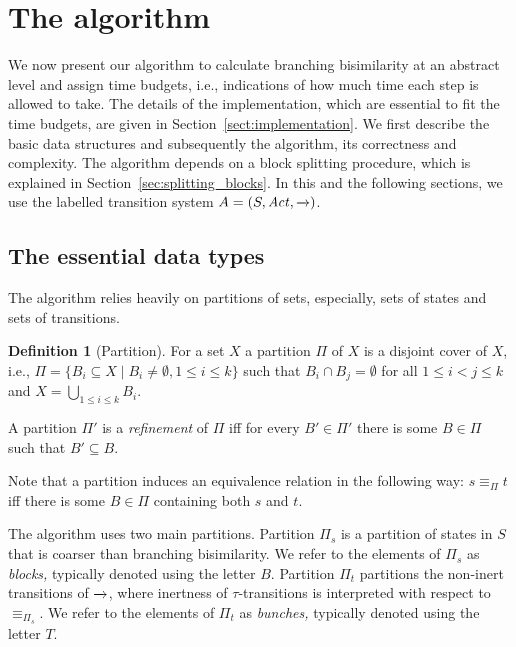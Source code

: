 \documentclass[a4paper,10pt]{article}
\theoremstyle{definition}
\newtheorem{definition}{Definition}[section]
\theoremstyle{plain}
\newcommand{\pijl}[1]{\mathrel{\text{$\xrightarrow{\smash[t]{#1}}$}}}
\begin{document}
\section{The algorithm}
\label{sec:high}

We now present our algorithm to calculate branching bisimilarity at an abstract level
and assign time budgets, i.e., indications of how much time each step is allowed to take.
The details of the implementation, which are essential to fit the time budgets, are given in Section~\ref{sect:implementation}.
We first describe the basic data structures and subsequently the algorithm, its correctness and complexity.
The algorithm depends on a block splitting procedure, which is explained in Section~\ref{sec:splitting_blocks}.
In this and the following sections, we use the labelled transition system $A=(S,\mathit{Act},\mathord{\pijl{}})$.


\subsection{The essential data types}
The algorithm relies heavily on partitions of sets, especially, sets of states and sets of transitions.

\begin{definition}[Partition]
For a set $X$ a partition $\Pi$ of $X$ is a disjoint cover of $X$, i.e., $\Pi=\{ B_i \subseteq X \mid B_i \not= \emptyset, 1\leq i\leq k\}$
such that $B_i\cap B_j=\emptyset$ for all $1\leq i<j\leq k$ and $X =\bigcup_{1\leq i\leq k}B_i$.

A partition $\Pi'$ is a \textit{refinement} of $\Pi$ iff for every $B' \in \Pi'$ there is some $B \in \Pi$ such that $B' \subseteq B$.
\end{definition}
\noindent%
Note that a partition induces an equivalence relation in the following way:
$s \equiv_\Pi t$ iff there is some $B \in \Pi$ containing both $s$ and $t$.

The algorithm uses two main partitions.
Partition $\Pi_s$ is a partition of states in $S$ that is coarser than branching bisimilarity.
We refer to the elements of $\Pi_s$ as \textit{blocks,} typically denoted using the letter $B$.
Partition $\Pi_t$ partitions the non-inert transitions of $\pijl{}$, where inertness of $\tau$-transitions is interpreted with respect to $\equiv_{\Pi_s}$.
We refer to the elements of $\Pi_t$ as \textit{bunches,} typically denoted using the letter $T$.
\end{document}
